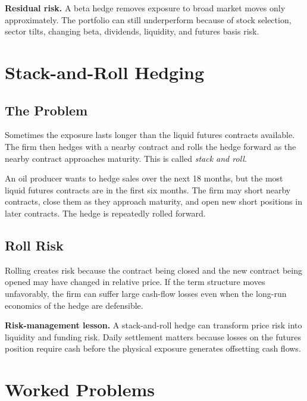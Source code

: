\begin{boxF}
\textbf{Residual risk.} A beta hedge removes exposure to broad market moves only
approximately. The portfolio can still underperform because of stock selection,
sector tilts, changing beta, dividends, liquidity, and futures basis risk.
\end{boxF}

\section{Stack-and-Roll Hedging}

\subsection{The Problem}

Sometimes the exposure lasts longer than the liquid futures contracts available.
The firm then hedges with a nearby contract and rolls the hedge forward as the
nearby contract approaches maturity. This is called \emph{stack and roll}.

\begin{exmp}
An oil producer wants to hedge sales over the next 18 months, but the most
liquid futures contracts are in the first six months. The firm may short nearby
contracts, close them as they approach maturity, and open new short positions in
later contracts. The hedge is repeatedly rolled forward.
\end{exmp}

\subsection{Roll Risk}

Rolling creates risk because the contract being closed and the new contract
being opened may have changed in relative price. If the term structure moves
unfavorably, the firm can suffer large cash-flow losses even when the long-run
economics of the hedge are defensible.

\begin{boxF}
\textbf{Risk-management lesson.} A stack-and-roll hedge can transform price risk
into liquidity and funding risk. Daily settlement matters because losses on the
futures position require cash before the physical exposure generates offsetting
cash flows.
\end{boxF}

\section{Worked Problems}

